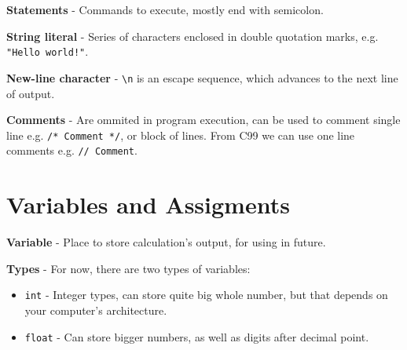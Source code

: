 \documentclass[12pt, openany]{book}
\begin{document}
    \textbf{Statements} - Commands to execute, mostly end with semicolon.

    \bigskip
    \textbf{String literal} - Series of characters enclosed in double quotation marks,
    e.g. \texttt{"Hello world!"}.

    \textbf{New-line character} - \texttt{\textbackslash n} is an escape sequence, which
    advances to the next line of output.

    \textbf{Comments} - Are ommited in program execution, can be used to comment single line
    e.g. \texttt{/* Comment */}, or block of lines. From C99 we can use one line comments
    e.g. \texttt{// Comment}.

    \section{Variables and Assigments}

    \textbf{Variable} - Place to store calculation's output, for using in future.
    \smallskip

    \textbf{Types} - For now, there are two types of variables:
    \begin{itemize}
        \item \texttt{int} - Integer types, can store quite big whole number, but
        that depends on your computer's architecture.
        \item \texttt{float} - Can store bigger numbers, as well as digits after
        decimal point.
    \end{itemize}
    

       
\end{document}
